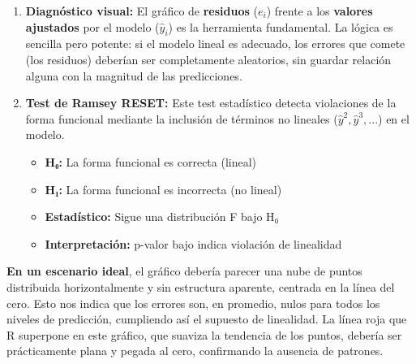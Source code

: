 \documentclass[
  letterpaper,
  DIV=11,
  numbers=noendperiod]{scrreprt}
\providecommand{\tightlist}{%
  \setlength{\itemsep}{0pt}\setlength{\parskip}{0pt}}
\begin{document}
\begin{enumerate}
\def\labelenumi{\arabic{enumi}.}
\item
  \textbf{Diagnóstico visual:} El gráfico de \textbf{residuos} (\(e_i\))
  frente a los \textbf{valores ajustados} por el modelo (\(\hat{y}_i\))
  es la herramienta fundamental. La lógica es sencilla pero potente: si
  el modelo lineal es adecuado, los errores que comete (los residuos)
  deberían ser completamente aleatorios, sin guardar relación alguna con
  la magnitud de las predicciones.
\item
  \textbf{Test de Ramsey RESET:} Este test estadístico detecta
  violaciones de la forma funcional mediante la inclusión de términos no
  lineales (\(\hat{y}^2, \hat{y}^3, ...\)) en el modelo.

  \begin{itemize}
  \tightlist
  \item
    \textbf{H₀:} La forma funcional es correcta (lineal)\\
  \item
    \textbf{H₁:} La forma funcional es incorrecta (no lineal)\\
  \item
    \textbf{Estadístico:} Sigue una distribución F bajo H₀\\
  \item
    \textbf{Interpretación:} p-valor bajo indica violación de linealidad
  \end{itemize}
\end{enumerate}

\textbf{En un escenario ideal}, el gráfico debería parecer una nube de
puntos distribuida horizontalmente y sin estructura aparente, centrada
en la línea del cero. Esto nos indica que los errores son, en promedio,
nulos para todos los niveles de predicción, cumpliendo así el supuesto
de linealidad. La línea roja que R superpone en este gráfico, que
suaviza la tendencia de los puntos, debería ser prácticamente plana y
pegada al cero, confirmando la ausencia de patrones.
\end{document}
